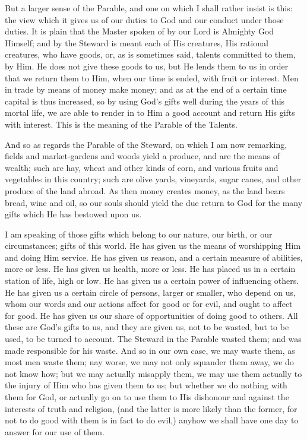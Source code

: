 But a larger sense of the Parable, and one on
which I shall rather insist is this: the view which it gives us of our
duties to God and our conduct under those duties. It is plain that the
Master spoken of by our Lord is Almighty God Himself; and by the
Steward is meant each of His creatures, His rational creatures, who
have goods, or, as is sometimes said, talents committed to them, by
Him. He does not give these goods to us, but He lends them to us in
order that we return them to Him, when our time is ended, with fruit
or interest. Men in trade by means of money make money; and as at the
end of a certain time capital is thus increased, so by using God's
gifts well during the years of this mortal life, we are able to render
in to Him a good account and return His gifts with interest. This is
the meaning of the Parable of the Talents.

And so as regards the Parable of the Steward, on
which I am now remarking, fields and market-gardens and woods yield a
produce, and are the means of wealth; such are hay, wheat and other
kinds of corn, and various fruits and vegetables in this country; such
are olive yards, vineyards, sugar canes, and other produce of
the land abroad. As then money creates money, as the land bears bread,
wine and oil, so our souls should yield the due return to God for the
many gifts which He has bestowed upon us.

I am speaking of those gifts which belong to our
nature, our birth, or our circumstances; gifts of this world. He has
given us the means of worshipping Him and doing Him service. He has
given us reason, and a certain measure of abilities, more or less. He
has given us health, more or less. He has placed us in a certain
station of life, high or low. He has given us a certain power of
influencing others. He has given us a certain circle of persons,
larger or smaller, who depend on us, whom our words and our actions
affect for good or for evil, and ought to affect for good. He has
given us our share of opportunities of doing good to others. All these
are God's gifts to us, and they are given us, not to be wasted, but to
be used, to be turned to account. The Steward in the Parable wasted
them; and was made responsible for his waste. And so in our own case,
we may waste them, as most men waste them; nay worse, we may not only
squander them away, we do not know how; but we may actually misapply
them, we may use them actually to the injury of Him who has given them
to us; but whether we do nothing with them for God, or actually go on
to use them to His dishonour and against the interests of truth
and religion, (and the latter is more likely than the former, for not
to do good with them is in fact to do evil,) anyhow we shall have one
day to answer for our use of them.

